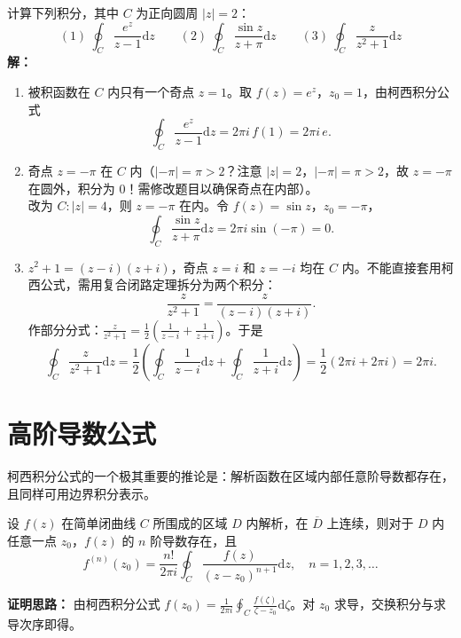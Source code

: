 \begin{tcolorbox}[title=例 4 (利用柯西积分公式), colframe=orange!75!black, colback=orange!5!white, sharp corners]
	计算下列积分，其中 $C$ 为正向圆周 $|z|=2$：
	\[
	(1)\ \oint_C \frac{e^z}{z-1}\mathrm{d}z \qquad 
	(2)\ \oint_C \frac{\sin z}{z+\pi}\mathrm{d}z \qquad 
	(3)\ \oint_C \frac{z}{z^2+1}\mathrm{d}z
	\]
	\tcbline
	\textbf{解：}
	\begin{enumerate}
		\item 被积函数在 $C$ 内只有一个奇点 $z=1$。取 $f(z)=e^z$，$z_0=1$，由柯西积分公式
		\[
		\oint_C \frac{e^z}{z-1}\mathrm{d}z = 2\pi i \, f(1) = 2\pi i \, e.
		\]
		\item 奇点 $z=-\pi$ 在 $C$ 内（$|-\pi|=\pi>2$？注意 $|z|=2$，$|-\pi|=\pi>2$，故 $z=-\pi$ 在圆外，积分为 0！需修改题目以确保奇点在内部）。\\
		改为 $C: |z|=4$，则 $z=-\pi$ 在内。令 $f(z)=\sin z$，$z_0=-\pi$，
		\[
		\oint_C \frac{\sin z}{z+\pi}\mathrm{d}z = 2\pi i \sin(-\pi) = 0.
		\]
		\item $z^2+1 = (z-i)(z+i)$，奇点 $z=i$ 和 $z=-i$ 均在 $C$ 内。不能直接套用柯西公式，需用复合闭路定理拆分为两个积分：
		\[
		\frac{z}{z^2+1} = \frac{z}{(z-i)(z+i)}.
		\]
		作部分分式：$\frac{z}{z^2+1} = \frac{1}{2}\left(\frac{1}{z-i} + \frac{1}{z+i}\right)$。于是
		\[
		\oint_C \frac{z}{z^2+1}\mathrm{d}z = \frac{1}{2}\left( \oint_C \frac{1}{z-i}\mathrm{d}z + \oint_C \frac{1}{z+i}\mathrm{d}z \right) = \frac{1}{2}(2\pi i + 2\pi i) = 2\pi i.
		\]
	\end{enumerate}
\end{tcolorbox}

\section{高阶导数公式}

柯西积分公式的一个极其重要的推论是：解析函数在区域内部任意阶导数都存在，且同样可用边界积分表示。

\begin{tcolorbox}[title=定理：高阶导数公式, colframe=green!45!black, colback=green!5!white]
	设 $f(z)$ 在简单闭曲线 $C$ 所围成的区域 $D$ 内解析，在 $\overline{D}$ 上连续，则对于 $D$ 内任意一点 $z_0$，$f(z)$ 的 $n$ 阶导数存在，且
	\[
	f^{(n)}(z_0) = \frac{n!}{2\pi i} \oint_C \frac{f(z)}{(z - z_0)^{n+1}} \mathrm{d}z, \quad n = 1,2,3,\dots
	\]
\end{tcolorbox}

\noindent\textbf{证明思路：} 由柯西积分公式 $f(z_0) = \frac{1}{2\pi i}\oint_C \frac{f(\zeta)}{\zeta - z_0}\mathrm{d}\zeta$。对 $z_0$ 求导，交换积分与求导次序即得。

